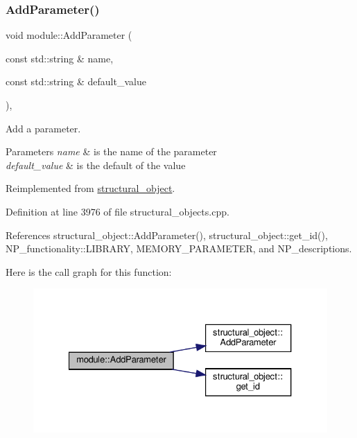 \subsubsection{\texorpdfstring{Add\+Parameter()}{AddParameter()}}
{\footnotesize\ttfamily void module\+::\+Add\+Parameter (\begin{DoxyParamCaption}\item[{const std\+::string \&}]{name,  }\item[{const std\+::string \&}]{default\+\_\+value }\end{DoxyParamCaption})\hspace{0.3cm}{\ttfamily [override]}, {\ttfamily [virtual]}}



Add a parameter. 


\begin{DoxyParams}{Parameters}
{\em name} & is the name of the parameter \\
\hline
{\em default\+\_\+value} & is the default of the value \\
\hline
\end{DoxyParams}


Reimplemented from \hyperlink{classstructural__object_a83ccf7f94a7c5d4590f337ff2b97c5b3}{structural\+\_\+object}.



Definition at line 3976 of file structural\+\_\+objects.\+cpp.



References structural\+\_\+object\+::\+Add\+Parameter(), structural\+\_\+object\+::get\+\_\+id(), N\+P\+\_\+functionality\+::\+L\+I\+B\+R\+A\+RY, M\+E\+M\+O\+R\+Y\+\_\+\+P\+A\+R\+A\+M\+E\+T\+ER, and N\+P\+\_\+descriptions.

Here is the call graph for this function\+:
\nopagebreak
\begin{figure}[H]
\begin{center}
\leavevmode
\includegraphics[width=327pt]{d0/dd3/classmodule_a08f3658653bf691cfe80c3f6db6a2e60_cgraph}
\end{center}
\end{figure}
\mbox{\label{classmodule_acb5a667c85804bef3a6097febf367893}} 
